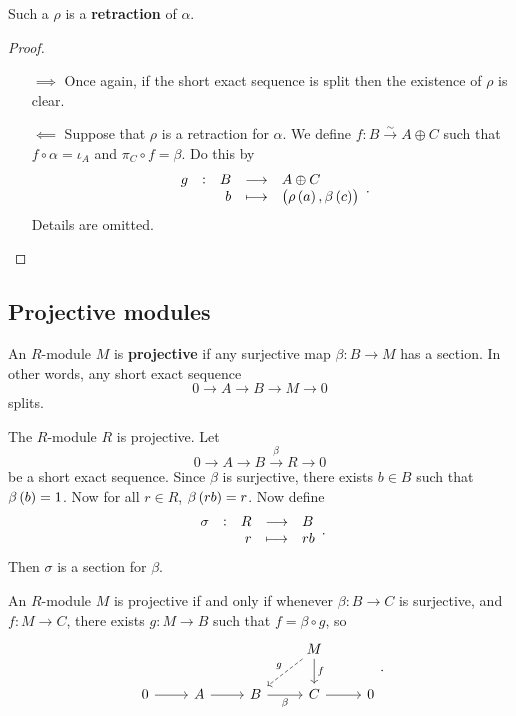 Such a $ \rho $ is a \textbf{retraction} of $ \alpha $.

\begin{proof}
\hfill
\begin{itemize}
\item[$ \implies $] Once again, if the short exact sequence is split then the existence of $ \rho $ is clear.
\item[$ \impliedby $] Suppose that $ \rho $ is a retraction for $ \alpha $. We define $ f : B \xrightarrow{\sim} A \oplus C $ such that $ f \circ \alpha = \iota_A $ and $ \pi_C \circ f = \beta $. Do this by
$$ \function[g]{B}{A \oplus C}{b}{\br{\rho\br{a}, \beta\br{c}}}. $$
Details are omitted.
\end{itemize}
\end{proof}

\pagebreak

\subsection{Projective modules}


\begin{definition}
An $ R $-module $ M $ is \textbf{projective} if any surjective map $ \beta : B \to M $ has a section. In other words, any short exact sequence
$$ 0 \to A \to B \to M \to 0 $$
splits.
\end{definition}

\begin{example*}
The $ R $-module $ R $ is projective. Let
$$ 0 \to A \to B \xrightarrow{\beta} R \to 0 $$
be a short exact sequence. Since $ \beta $ is surjective, there exists $ b \in B $ such that $ \beta\br{b} = 1 $. Now for all $ r \in R $, $ \beta\br{rb} = r $. Now define
$$ \function[\sigma]{R}{B}{r}{rb}. $$
Then $ \sigma $ is a section for $ \beta $.
\end{example*}

\begin{proposition}
An $ R $-module $ M $ is projective if and only if whenever $ \beta : B \to C $ is surjective, and $ f : M \to C $, there exists $ g : M \to B $ such that $ f = \beta \circ g $, so
$$
\begin{tikzcd}
& & & M \arrow[dashed, swap]{dl}{g} \arrow{d}{f} & \\
0 \arrow{r} & A \arrow{r} & B \arrow[swap]{r}{\beta} & C \arrow{r} & 0
\end{tikzcd}.
$$
\end{proposition}

